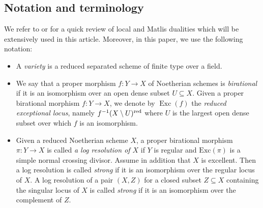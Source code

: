 \documentclass[letterpaper,11pt]{amsart}
\theoremstyle{plain}
\theoremstyle{definition}
\theoremstyle{remark}
\DeclareMathOperator{\Exc} {Exc}
\begin{document}
\subsection{Notation and terminology} \label{ss:notation}
We refer to \cite[Tag 08XG]{stacks-project} or  \cite[Subsection 2.7]{KTTWYY1} for a quick review of local and Matlis dualities which will be extensively used in this article. Moreover, in this paper, we use the following notation:
\begin{itemize}
\item A \textit{variety} is a reduced  separated scheme of finite type over a field.

\item We say that a proper morphism $f \colon Y \to X$ of Noetherian schemes is \emph{birational} if it is an isomorphism over an open dense subset $U \subseteq X$. Given a proper birational morphism $f\colon Y\to X$, we denote by $\Exc(f)$ the \emph{reduced exceptional locus}, namely $f^{-1}(X \setminus U)^{\rm red}$ where $U$ is the largest open dense subset over which $f$ is an isomorphism.

\item Given a reduced Noetherian scheme $X$, a proper birational morphism $\pi \colon Y \to X$ is called \emph{a log resolution of $X$} if $Y$ is regular and $\mathrm{Exc}(\pi)$ is a simple normal crossing divisor. Assume in addition that $X$ is excellent. Then a log resolution is called \emph{strong} if it is an isomorphism over the regular locus of $X$. A log resolution of a pair $(X,Z)$ for a closed subset $Z \subseteq X$ containing the singular locus of $X$ is called \emph{strong} if it is an isomorphism over the complement of $Z$.


\end{itemize}
\end{document}
